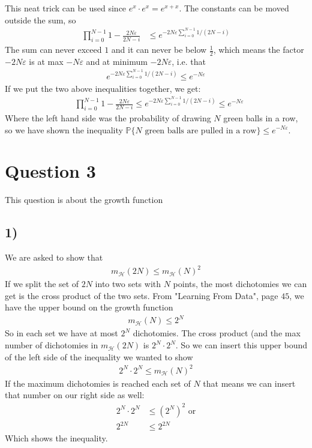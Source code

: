 \documentclass[a4paper]{article}
\begin{document}
This neat trick can be used since $e^x\cdot e^x=e^{x+x}$. The constants can be moved outside the sum, so
\begin{align*}
\prod_{i=0}^{N-1} 1-\frac{2N\varepsilon}{2N-i}&\leq  e^{-2N\varepsilon\sum_{i=0}^{N-1}1/(2N-i)}
\end{align*}
The sum can never exceed $1$ and it can never be below $\frac{1}{2}$, which means the factor $-2N\varepsilon$ is at max $-N\varepsilon$ and at minimum $-2N\varepsilon$, i.e. that
\begin{align*}
e^{-2N\varepsilon\sum_{i=0}^{N-1}1/(2N-i)}\leq e^{-N\varepsilon}
\end{align*}
If we put the two above inequalities together, we get:
\begin{align*}
&\prod_{i=0}^{N-1} 1-\frac{2N\varepsilon}{2N-i}\leq e^{-2N\varepsilon\sum_{i=0}^{N-1}1/(2N-i)}\leq e^{-N\varepsilon}
\end{align*}
Where the left hand side was the probability of drawing $N$ green balls in a row, so we have shown the inequality $\mathbb{P}\{\mbox{$N$ green balls are pulled in a row}\}\leq e^{-N\varepsilon}$.

\newpage
\section*{Question 3}
This question is about the growth function
\subsection*{1)}
We are asked to show that
\begin{align*}
m_{\mathcal{H}}(2N)\leq m_{\mathcal{H}}(N)^2
\end{align*}
If we split the set of $2N$ into two sets with $N$ points, the most dichotomies we can get is the cross product of the two sets. From "Learning From Data", page $45$, we have the upper bound on the growth function
\begin{align*}
m_{\mathcal{H}}(N)\leq 2^N
\end{align*}
So in each set we have at most $2^N$ dichotomies. The cross product (and the max number of dichotomies in $m_{\mathcal{H}}(2N)$ is $2^N\cdot 2^N$. So we can insert this upper bound of the left side of the inequality we wanted to show 
\begin{align*}
2^N\cdot 2^N\leq m_{\mathcal{H}}(N)^2
\end{align*}
If the maximum dichotomies is reached each set of $N$ that means we can insert that number on our right side as well:
\begin{align*}
2^N\cdot 2^N&\leq \left(2^N\right)^2 \mbox{  or} \\
2^{2N}&\leq 2^{2N}
\end{align*}
Which shows the inequality.
\end{document}
